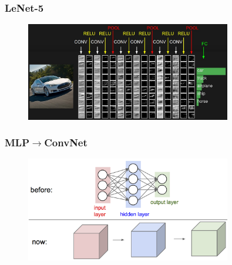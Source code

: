\documentclass{beamer}
\begin{document}
\begin{frame}
  \frametitle{LeNet-5}
  \begin{figure}[!htm]
    \centering
    \includegraphics[width=0.8\textwidth]{convnet.jpeg}
  \end{figure}
\end{frame}

\begin{frame}
  \frametitle{MLP$\rightarrow$ConvNet}

  \begin{figure}[!htm]
    \centering
    \includegraphics[width=0.8\textwidth]{convnet_gist.png}
  \end{figure}
\end{frame}
\end{document}

